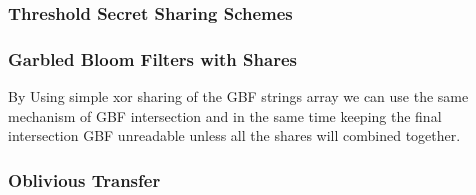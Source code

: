\iffalse %
\begin{algorithm}[H]
\textbf{Garbled Bloom filter}
\begin{algorithmic}[1]
\Procedure{GBFinsert}{$item,GBFarray[],m,k,H,\lambda$}
\State {$finalString \gets \{0^\lambda\}$}
\State {$finalStringIndex \gets empty$}
\For{$i:=0..k$}
	\State{$hash \gets H[i]$}
	\State{$index \gets hash(item)$} 
		\If{$GBFarray[index]$ is empty}
			\If{$finalStringIndex = empty$}
				\State{$finalStringIndex \gets i$}
			\Else
				\State {$r \gets RandomString(\lambda)$}
				\State{$GBFarray[index] \gets r$}	
				\State{$finalString \gets finalString \oplus r$}
			\EndIf		
		\Else
		\State {$finalString \gets finalString \oplus GBFarray[index]$}
		\EndIf
\EndFor
\State {$GBFarray[finalStringIndex] \gets finalString$}
\EndProcedure

\Function{GBFchecking}{$item,BFarray[],m,k,H$}
\For{$i:=0..k$}
	\State{$hash \gets H[i]$}
	\State{$index \gets hash(item)$} \Comment{index will be between $0$ to $m$}
	\If{$BFarray[index] = 0$} 
	\State \Return False
	\EndIf
\EndFor
\State \Return True
\EndFunction

\Function{GBFintersec}{$BFarray_1[],BFarray_2[],m$}
\For{$i:=0..m$}
\State {$BFintersection[i] \gets BFarray_1[i] \wedge BFarray_2[i]$}
\EndFor
\State \Return $BFarrayOfIntersec[]$
\EndFunction
\end{algorithmic}
\end{algorithm}

\fi%


 
 
\subsubsection{Threshold Secret Sharing Schemes}
 
\subsubsection{Garbled Bloom Filters with Shares} By Using simple xor sharing of the GBF strings array we can use the same mechanism of GBF intersection and in the same time keeping the final intersection GBF unreadable unless all the shares will combined together.


 
 
 
\subsubsection{Oblivious Transfer}


